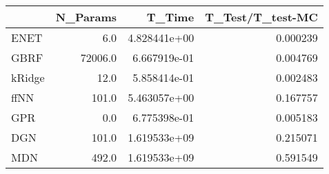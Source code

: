 \begin{tabular}{lrrr}
\toprule
{} &  N\_Params &        T\_Time &  T\_Test/T\_test-MC \\
\midrule
ENET   &       6.0 &  4.828441e+00 &          0.000239 \\
GBRF   &   72006.0 &  6.667919e-01 &          0.004769 \\
kRidge &      12.0 &  5.858414e-01 &          0.002483 \\
ffNN   &     101.0 &  5.463057e+00 &          0.167757 \\
GPR    &       0.0 &  6.775398e-01 &          0.005183 \\
DGN    &     101.0 &  1.619533e+09 &          0.215071 \\
MDN    &     492.0 &  1.619533e+09 &          0.591549 \\
\bottomrule
\end{tabular}
